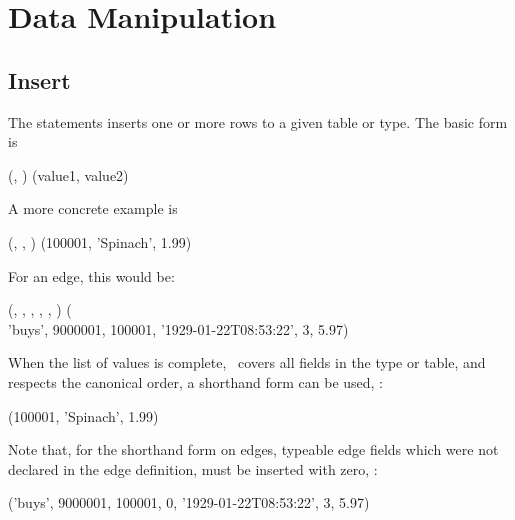 \section{Data Manipulation}
\subsection{Insert}
The  statements inserts one or more rows
to a given table or type.
The basic form is

  
                      (,
                       )
                      (value1, value2)

A more concrete example is

  
                      (,
                       ,
                       )
                      (100001, 'Spinach', 1.99)

For an edge, this would be:

\begin{minipage}{\textwidth}
  
                      (,
                       ,
                       ,
                       ,
                       ,
                       )
                      (\\
\hspace*{2.99cm}       'buys', 9000001, 100001,
                       '1929-01-22T08:53:22',
                       3, 5.97)
\end{minipage}

When the list of values is complete,
\ie\ covers all fields in the type or table,
and respects the canonical order,
a shorthand form can be used, \eg:

  
                      (100001, 'Spinach', 1.99)

Note that, for the shorthand form on edges,
typeable edge fields which were not declared
in the edge definition, must be inserted with zero, \eg:

\begin{minipage}{\textwidth}
  
                      ('buys', 9000001, 100001, 0,
                       '1929-01-22T08:53:22',
                       3, 5.97)
\end{minipage}

